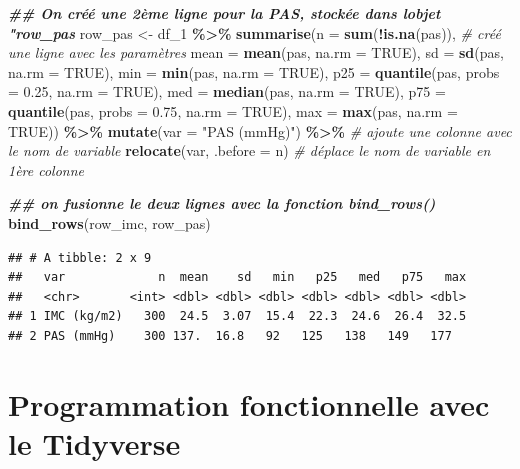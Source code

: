 \documentclass[
]{book}
\newenvironment{Shaded}{\begin{snugshade}}{\end{snugshade}}
\newcommand{\AttributeTok}[1]{\textcolor[rgb]{0.13,0.29,0.53}{#1}}
\newcommand{\CommentTok}[1]{\textcolor[rgb]{0.56,0.35,0.01}{\textit{#1}}}
\newcommand{\ConstantTok}[1]{\textcolor[rgb]{0.56,0.35,0.01}{#1}}
\newcommand{\DocumentationTok}[1]{\textcolor[rgb]{0.56,0.35,0.01}{\textbf{\textit{#1}}}}
\newcommand{\FloatTok}[1]{\textcolor[rgb]{0.00,0.00,0.81}{#1}}
\newcommand{\FunctionTok}[1]{\textcolor[rgb]{0.13,0.29,0.53}{\textbf{#1}}}
\newcommand{\NormalTok}[1]{#1}
\newcommand{\OtherTok}[1]{\textcolor[rgb]{0.56,0.35,0.01}{#1}}
\newcommand{\SpecialCharTok}[1]{\textcolor[rgb]{0.81,0.36,0.00}{\textbf{#1}}}
\newcommand{\StringTok}[1]{\textcolor[rgb]{0.31,0.60,0.02}{#1}}
\begin{document}
\begin{Shaded}
\begin{Highlighting}[]
\DocumentationTok{\#\# On créé une 2ème ligne pour la PAS, stockée dans l\textquotesingle{}objet "row\_pas}
\NormalTok{row\_pas }\OtherTok{\textless{}{-}}\NormalTok{ df\_1 }\SpecialCharTok{\%\textgreater{}\%} 
  \FunctionTok{summarise}\NormalTok{(}\AttributeTok{n =} \FunctionTok{sum}\NormalTok{(}\SpecialCharTok{!}\FunctionTok{is.na}\NormalTok{(pas)), }\CommentTok{\# créé une ligne avec les paramètres}
            \AttributeTok{mean =} \FunctionTok{mean}\NormalTok{(pas, }\AttributeTok{na.rm =} \ConstantTok{TRUE}\NormalTok{),}
            \AttributeTok{sd =} \FunctionTok{sd}\NormalTok{(pas, }\AttributeTok{na.rm =} \ConstantTok{TRUE}\NormalTok{), }
            \AttributeTok{min =} \FunctionTok{min}\NormalTok{(pas, }\AttributeTok{na.rm =} \ConstantTok{TRUE}\NormalTok{), }
            \AttributeTok{p25 =} \FunctionTok{quantile}\NormalTok{(pas, }\AttributeTok{probs =} \FloatTok{0.25}\NormalTok{, }\AttributeTok{na.rm =} \ConstantTok{TRUE}\NormalTok{),}
            \AttributeTok{med =} \FunctionTok{median}\NormalTok{(pas, }\AttributeTok{na.rm =} \ConstantTok{TRUE}\NormalTok{),}
            \AttributeTok{p75 =} \FunctionTok{quantile}\NormalTok{(pas, }\AttributeTok{probs =} \FloatTok{0.75}\NormalTok{, }\AttributeTok{na.rm =} \ConstantTok{TRUE}\NormalTok{),}
            \AttributeTok{max =} \FunctionTok{max}\NormalTok{(pas, }\AttributeTok{na.rm =} \ConstantTok{TRUE}\NormalTok{)) }\SpecialCharTok{\%\textgreater{}\%}
  \FunctionTok{mutate}\NormalTok{(}\AttributeTok{var =} \StringTok{"PAS (mmHg)"}\NormalTok{) }\SpecialCharTok{\%\textgreater{}\%} \CommentTok{\# ajoute une colonne avec le nom de variable}
  \FunctionTok{relocate}\NormalTok{(var, }\AttributeTok{.before =}\NormalTok{ n) }\CommentTok{\# déplace le nom de variable en 1ère colonne}

\DocumentationTok{\#\# on fusionne le deux lignes avec la fonction bind\_rows()}
\FunctionTok{bind\_rows}\NormalTok{(row\_imc, row\_pas)}
\end{Highlighting}
\end{Shaded}

\begin{verbatim}
## # A tibble: 2 x 9
##   var             n  mean    sd   min   p25   med   p75   max
##   <chr>       <int> <dbl> <dbl> <dbl> <dbl> <dbl> <dbl> <dbl>
## 1 IMC (kg/m2)   300  24.5  3.07  15.4  22.3  24.6  26.4  32.5
## 2 PAS (mmHg)    300 137.  16.8   92   125   138   149   177
\end{verbatim}

\section{Programmation fonctionnelle avec le Tidyverse}\label{programmation-fonctionnelle-avec-le-tidyverse}
\end{document}
